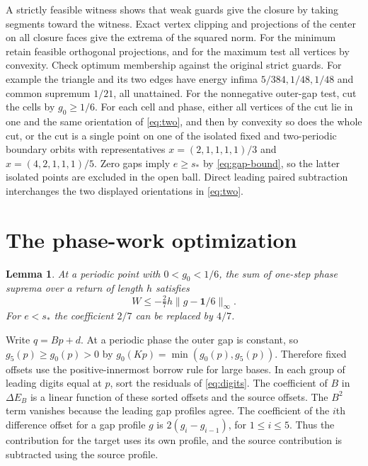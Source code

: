 \documentclass[11pt,reqno]{amsart}
\newtheorem{lemma}[theorem]{Lemma}
\theoremstyle{remark}
\begin{document}
A strictly feasible witness shows that weak guards give the closure by taking segments toward the witness. Exact vertex clipping and projections of the center on all closure faces give the extrema of the squared norm. For the minimum retain feasible orthogonal projections, and for the maximum test all vertices by convexity. Check optimum membership against the original strict guards. For example the triangle and its two edges have energy infima \(5/384,1/48,1/48\) and common supremum \(1/21\), all unattained. For the nonnegative outer-gap test, cut the cells by \(g_0\ge1/6\). For each cell and phase, either all vertices of the cut lie in one and the same orientation of \eqref{eq:two}, and then by convexity so does the whole cut, or the cut is a single point on one of the isolated fixed and two-periodic boundary orbits with representatives \(x=(2,1,1,1,1)/3\) and \(x=(4,2,1,1,1)/5\). Zero gaps imply \(e\ge s_*\) by \eqref{eq:gap-bound}, so the latter isolated points are excluded in the open ball. Direct leading paired subtraction interchanges the two displayed orientations in \eqref{eq:two}.

\section{The phase-work optimization}\label{ap:work}

\begin{lemma}\label{lem:work}
At a periodic point with \(0<g_0<1/6\), the sum of one-step phase suprema over a return of length \(h\) satisfies
\[
 W\le-\tfrac27 h\|g-\boldsymbol 1/6\|_\infty.
\]
For \(e<s_*\) the coefficient \(2/7\) can be replaced by \(4/7\).
\end{lemma}

Write \(q=Bp+d\). At a periodic phase the outer gap is constant, so \(g_5(p)\ge g_0(p)>0\) by \(g_0(Kp)=\min(g_0(p),g_5(p))\). Therefore fixed offsets use the positive-innermost borrow rule for large bases. In each group of leading digits equal at \(p\), sort the residuals of \eqref{eq:digits}. The coefficient of \(B\) in \(\Delta E_B\) is a linear function of these sorted offsets and the source offsets. The \(B^2\) term vanishes because the leading gap profiles agree. The coefficient of the \(i\)th difference offset for a gap profile \(g\) is \(2(g_i-g_{i-1})\), for \(1\le i\le5\). Thus the contribution for the target uses its own profile, and the source contribution is subtracted using the source profile.
\end{document}
